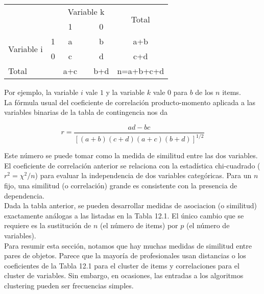 \documentclass[a4paper, 20pt]{article}
\begin{document}
\begin{table}[]
\begin{tabular}{ll|clc|c|l}
\multicolumn{2}{l|}{\multirow{2}{*}{}} & \multicolumn{3}{c}{Variable k} & \multicolumn{2}{c|}{\multirow{2}{*}{Total}} \\
\multicolumn{2}{l|}{}                  & 1        &       & 0       & \multicolumn{2}{c|}{}                        \\ \hline
\multirow{2}{*}{Variable i}       & 1      & a        &       & b       & \multicolumn{2}{c|}{a+b}                     \\
                              & 0      & c        &       & d       & \multicolumn{2}{c|}{c+d}                     \\ \hline
\multicolumn{2}{l|}{Total}            & a+c      &       & b+d     & \multicolumn{2}{c|}{n=a+b+c+d}              
\end{tabular}
\end{table}

Por ejemplo, la variable $i$ vale $1$ y la variable $k$ vale $0$ para $b$ de los $n$ items.\\
La fórmula usual del coeficiente de correlación producto-momento aplicada a las variables binarias de la tabla de contingencia nos da

$$r = \frac{ad-bc}{[(a+b)(c+d)(a+c)(b+d)]^{1/2}}$$

Este número se puede tomar como la medida de similitud entre las dos variables.\\
El coeficiente de correlación anterior se relaciona con la estadística chi-cuadrado ($r^2=\chi^2/n$) para evaluar la independencia de dos variables categóricas. Para un $n$ fijo, una similitud (o correlación) grande es consistente con la presencia de dependencia.\\

Dada la tabla anterior, se pueden desarrollar medidas de asociacion (o similitud) exactamente análogas a las listadas en la Tabla 12.1. El único cambio que se requiere es la sustitución de $n$ (el número de items) por $p$ (el número de variables).\\

Para resumir esta sección, notamos que hay muchas medidas de similitud entre pares de objetos. Parece que la mayoría de profesionales usan distancias o los coeficientes de la Tabla 12.1 para el cluster de items y correlaciones para el cluster de variables. Sin embargo, en ocasiones, las entradas a los algoritmos clustering pueden ser frecuencias simples.\\
\end{document}
